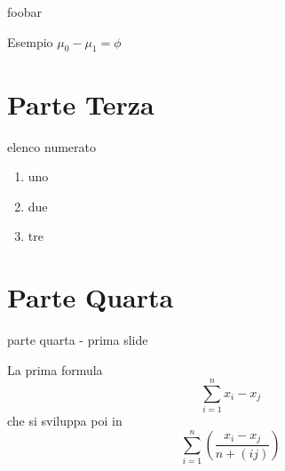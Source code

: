 \begin{frame}{foobar}

\begin{example}{Esempio}
    $\mu_0 - \mu_1 = \phi$
\end{example}

\end{frame}

\section{Parte Terza}\label{parte-terza}

\begin{frame}{elenco numerato}

\begin{enumerate}[<+->]
\def\labelenumi{\arabic{enumi}.}
\itemsep1pt\parskip0pt
\item
  uno
\item
  due
\item
  tre
\end{enumerate}

\end{frame}

\section{Parte Quarta}\label{parte-quarta}

\begin{frame}{parte quarta - prima slide}

La prima formula \[\sum_{i=1}^n{x_i - x_j}\] \pause
che si sviluppa poi in \pause
\[\sum_{i=1}^n{\left(\frac{x_i - x_j}{n + (i j)}\right)}\]

\end{frame}
